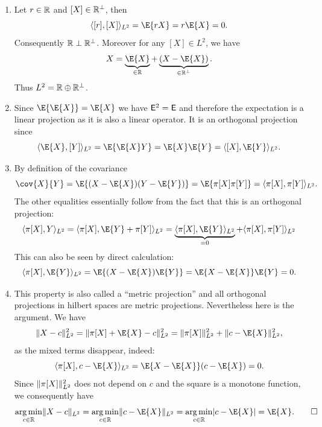 \begin{solution}
\begin{enumerate}[wide=0pt]
    \item[\ref{it: (L2 projection) orthogonal decomposition}]
    Let \(r\in \mathbb{R}\) and \([X]\in \mathbb{R}^\perp\), then
    \[
        \scp{[r], [X]}_{L^2} = \E{rX} = r\E{X} = 0.
    \]
    Consequently \(\mathbb{R} \perp \mathbb{R}^\perp\).  Moreover for any \([X]
    \in L^2\), we have
    \[
        X = \underbrace{\E{X}}_{\in \real} + \underbrace{(X-\E{X})}_{\in \real^\perp}.
    \]
    \vspace{-1ex}
    Thus \(L^2 = \mathbb{R} \oplus \mathbb{R}^\perp\).

    \item[\ref{it: (L2 projection) expectation is projection}]
    Since \(\E{\E{X}} = \E{X}\) we have \(\mathsf{E}^2 = \mathsf{E}\)
    and therefore the expectation is a linear projection as it is also a
    linear operator. It is an orthogonal projection since
    \[
        \scp{\E{X}, [Y]}_{L^2} = \E{\E{X}Y} = \E{X}\E{Y} = \scp{[X], \E{Y}}_{L^2}.
    \]

    \item[\ref{it: (L2 projection) covariance is inner product}]
    By definition of the covariance
    \[
        \cov{X}{Y}
        = \E{(X-\E{X})(Y-\E{Y})}
        = \E{\pi[X]\pi[Y]} = \scp{\pi[X], \pi[Y]}_{L^2}.
    \]
    The other equalities essentially follow from the fact that this is an
    orthogonal projection:
    \[
        \scp{\pi[X], Y}_{L^2}
        = \scp{\pi[X], \E{Y} + \pi[Y]}_{L^2}
        = \underbrace{\scp{\pi[X], \E{Y}}_{L^2}}_{=0} + \scp{\pi[X], \pi[Y]}_{L^2}
    \]
    This can also be seen by direct calculation:
    \[
        \scp{\pi[X], \E{Y}}_{L^2} = \E{(X-\E{X})\E{Y}} = \E{X -\E{X}}\E{Y} = 0.
    \]

    \item[\ref{it: (L2 projection) expectation is argmin}]
    This property is also called a ``metric projection'' and all orthogonal
    projections in hilbert spaces are metric projections. Nevertheless here
    is the argument. We have
    \[
        \norm{X - c}_{L^2}^2
        = \norm{\pi[X] + \E{X} - c}_{L^2}^2
        = \norm{\pi[X]}_{L^2}^2 + \norm{c-\E{X}}_{L^2}^2,
    \]
    as the mixed terms disappear, indeed:
    \[
        \scp{\pi[X], c-\E{X}}_{L^2} = \E{X - \E{X}}(c-\E{X}) = 0.
    \]
    Since \(\lVert\pi[X]\rVert_{L^2}^2\) does not depend on \(c\) and the
    square is a monotone function, we consequently have
    \[
        \argmin_{c\in \real} \norm{X - c}_{L^2}
        = \argmin_{c\in \real} \norm{c-\E{X}}_{L^2}
        = \argmin_{c\in \real} \abs{c-\E{X}}
        = \E{X}.
        \qedhere
    \]
\end{enumerate} 
\end{solution}
